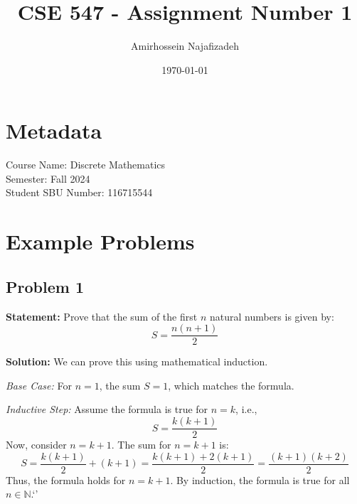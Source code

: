 \documentclass[12pt]{article}
\begin{document}
\title{CSE 547 - Assignment Number 1}
\author{Amirhossein Najafizadeh}
\date{\today}
\maketitle

\section*{Metadata}
Course Name: Discrete Mathematics \\
Semester: Fall 2024 \\
Student SBU Number: 116715544

\section{Example Problems}
\subsection{Problem 1}
\textbf{Statement:} Prove that the sum of the first $n$ natural numbers is given by:
\[
S = \frac{n(n+1)}{2}
\]

\textbf{Solution:} We can prove this using mathematical induction.

\textit{Base Case:} For $n = 1$, the sum $S = 1$, which matches the formula.

\textit{Inductive Step:} Assume the formula is true for $n = k$, i.e.,
\[
S = \frac{k(k+1)}{2}
\]
Now, consider $n = k+1$. The sum for $n = k+1$ is:
\[
S = \frac{k(k+1)}{2} + (k+1) = \frac{k(k+1) + 2(k+1)}{2} = \frac{(k+1)(k+2)}{2}
\]
Thus, the formula holds for $n = k+1$. By induction, the formula is true for all $n \in \mathbb{N}$.`'
\end{document}
